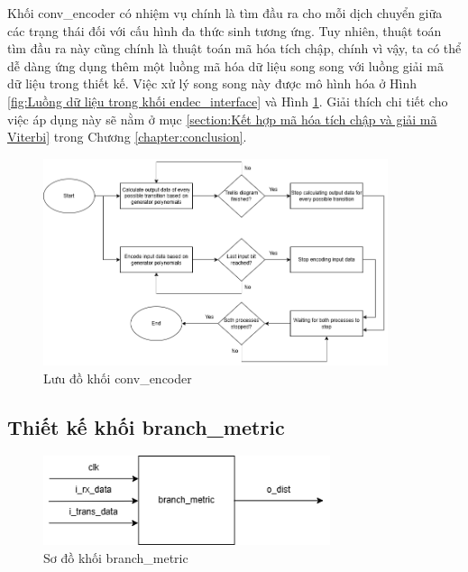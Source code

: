 \documentclass[../DoAn.tex]{subfiles}
\begin{document}
Khối conv\_encoder có nhiệm vụ chính là tìm đầu ra cho mỗi dịch chuyển giữa các trạng thái đối với cấu hình đa thức sinh tương ứng. Tuy nhiên, thuật toán tìm đầu ra này cũng chính là thuật toán mã hóa tích chập, chính vì vậy, ta có thể dễ dàng ứng dụng thêm một luồng mã hóa dữ liệu song song với luồng giải mã dữ liệu trong thiết kế. Việc xử lý song song này được mô hình hóa ở Hình \ref{fig:Luồng dữ liệu trong khối endec_interface} và Hình \ref{fig:Lưu đồ khối conv_encoder}. Giải thích chi tiết cho việc áp dụng này sẽ nằm ở mục \ref{section:Kết hợp mã hóa tích chập và giải mã Viterbi} trong Chương \ref{chapter:conclusion}.

\begin{figure}[H]
    \centering
    \includegraphics[width=0.9\textwidth, height=0.5\textheight, keepaspectratio]{Hinhve/Chuong 4/conv encoder flow chart.png}
    \caption{Lưu đồ khối conv\_encoder}
    \label{fig:Lưu đồ khối conv_encoder}
\end{figure}


\subsection{Thiết kế khối branch\_metric}
\begin{figure}[H]
    \centering
    \includegraphics[width=0.75\textwidth, height=0.10\textheight, keepaspectratio]{Hinhve/Chuong 4/branch metric.png}
    \caption{Sơ đồ khối branch\_metric}
\end{figure}
\end{document}
